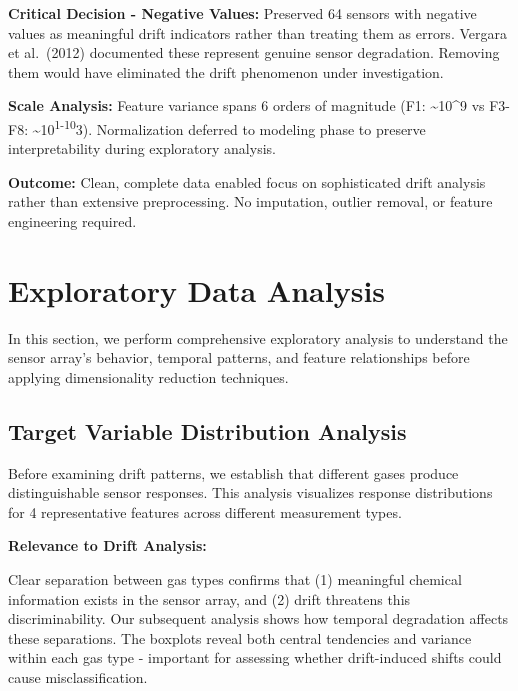 \documentclass[
  letterpaper,
  DIV=11,
  numbers=noendperiod]{scrartcl}
\begin{document}
\textbf{Critical Decision - Negative Values:} Preserved 64 sensors with
negative values as meaningful drift indicators rather than treating them
as errors. Vergara et al.~(2012) documented these represent genuine
sensor degradation. Removing them would have eliminated the drift
phenomenon under investigation.

\textbf{Scale Analysis:} Feature variance spans 6 orders of magnitude
(F1: \textasciitilde10\^{}9 vs F3-F8:
\textasciitilde10\textsuperscript{1-10}3). Normalization deferred to
modeling phase to preserve interpretability during exploratory analysis.

\textbf{Outcome:} Clean, complete data enabled focus on sophisticated
drift analysis rather than extensive preprocessing. No imputation,
outlier removal, or feature engineering required.

\section{Exploratory Data Analysis}\label{exploratory-data-analysis}

In this section, we perform comprehensive exploratory analysis to
understand the sensor array's behavior, temporal patterns, and feature
relationships before applying dimensionality reduction techniques.

\subsection{Target Variable Distribution
Analysis}\label{target-variable-distribution-analysis}

Before examining drift patterns, we establish that different gases
produce distinguishable sensor responses. This analysis visualizes
response distributions for 4 representative features across different
measurement types.

\textbf{Relevance to Drift Analysis:}

Clear separation between gas types confirms that (1) meaningful chemical
information exists in the sensor array, and (2) drift threatens this
discriminability. Our subsequent analysis shows how temporal degradation
affects these separations. The boxplots reveal both central tendencies
and variance within each gas type - important for assessing whether
drift-induced shifts could cause misclassification.
\end{document}
